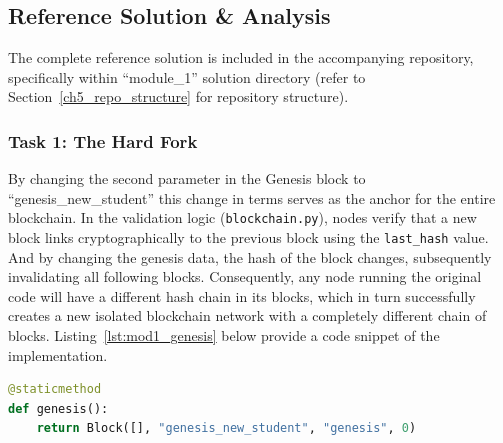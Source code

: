 \subsection{Reference Solution \& Analysis}
The complete reference solution is included in the accompanying repository, specifically within \enquote{module\_1} solution directory (refer to Section~\ref{ch5_repo_structure} for repository structure).

\subsubsection*{Task 1: The Hard Fork}
By changing the second parameter in the Genesis block to \enquote{genesis\_new\_student} this change in terms serves as the anchor for the entire blockchain. In the validation logic (\texttt{blockchain.py}), nodes verify that a new block links cryptographically to the previous block using the \texttt{last\_hash} value. And by changing the genesis data, the hash of the block changes, subsequently invalidating all following blocks. Consequently, any node running the original code will have a different hash chain in its blocks, which in turn successfully creates a new isolated blockchain network with a completely different chain of blocks. Listing~\ref{lst:mod1_genesis} below provide a code snippet of the implementation.

\begin{lstlisting}[language=Python, caption=Genesis Block Modification, label=lst:mod1_genesis]
@staticmethod
def genesis():
    return Block([], "genesis_new_student", "genesis", 0)
\end{lstlisting}

